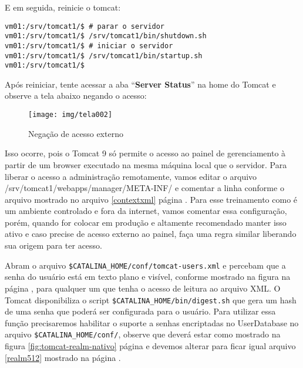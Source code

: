 E em seguida, reinicie o tomcat:

\begin{lstlisting}[breaklines=true,basicstyle=\ttfamily, 
label=restartTomcat,
breaklines=true,caption=\firacoderetina Iniciar e Parar tomcat manualmente,
postbreak=\mbox{\textcolor{red}{$\hookrightarrow$}\space},
showstringspaces=false]
vm01:/srv/tomcat1/$ # parar o servidor	
vm01:/srv/tomcat1/$ /srv/tomcat1/bin/shutdown.sh
vm01:/srv/tomcat1/$ # iniciar o servidor
vm01:/srv/tomcat1/$ /srv/tomcat1/bin/startup.sh
vm01:/srv/tomcat1/$ 
\end{lstlisting}

Após reiniciar, tente acessar a aba “\textbf{Server Status}” na home do Tomcat e observe a tela abaixo negando o acesso:

\begin{figure}[H]
	\centering
	\caption[Negacao de acesso]{Negação de acesso externo}
	\texttt{[image: img/tela002]}
	\label{fig:tomcat-erro-acesso}
\end{figure}

Isso ocorre, pois o Tomcat 9 só permite o acesso ao painel de gerenciamento à partir de um browser executado na mesma máquina local que o servidor. Para liberar o acesso a administração remotamente, vamos editar o arquivo /srv/tomcat1/webapps/manager/META-INF/ e comentar a linha conforme o arquivo mostrado no arquivo \ref{contextxml} página \pageref{contextxml}. Para esse treinamento como é um ambiente controlado e fora da internet, vamos comentar essa configuração, porém, quando for colocar em produção e altamente recomendado manter isso ativo e caso precise de acesso externo ao painel, faça uma regra similar liberando sua origem para ter acesso.




Abram o arquivo \texttt{\$CATALINA\_HOME/conf/tomcat-users.xml} e percebam que a senha do usuário está em texto plano e visível, conforme mostrado na figura  na página \pageref{fig:tomcat-users-texto-plano}, para qualquer um que tenha o acesso de leitura ao arquivo XML. O Tomcat disponibiliza o script \texttt{\$CATALINA\_HOME/bin/digest.sh} que gera um hash de uma senha que poderá ser configurada para o usuário. Para utilizar essa função precisaremos habilitar o suporte a senhas encriptadas no UserDatabase no arquivo \texttt{\$CATALINA\_HOME/conf/}, observe que deverá estar como mostrado na figura \ref{fig:tomcat-realm-nativo} página \pageref{fig:tomcat-realm-nativo} e devemos alterar para ficar igual arquivo \ref{realm512} mostrado na página \pageref{realm512}.

